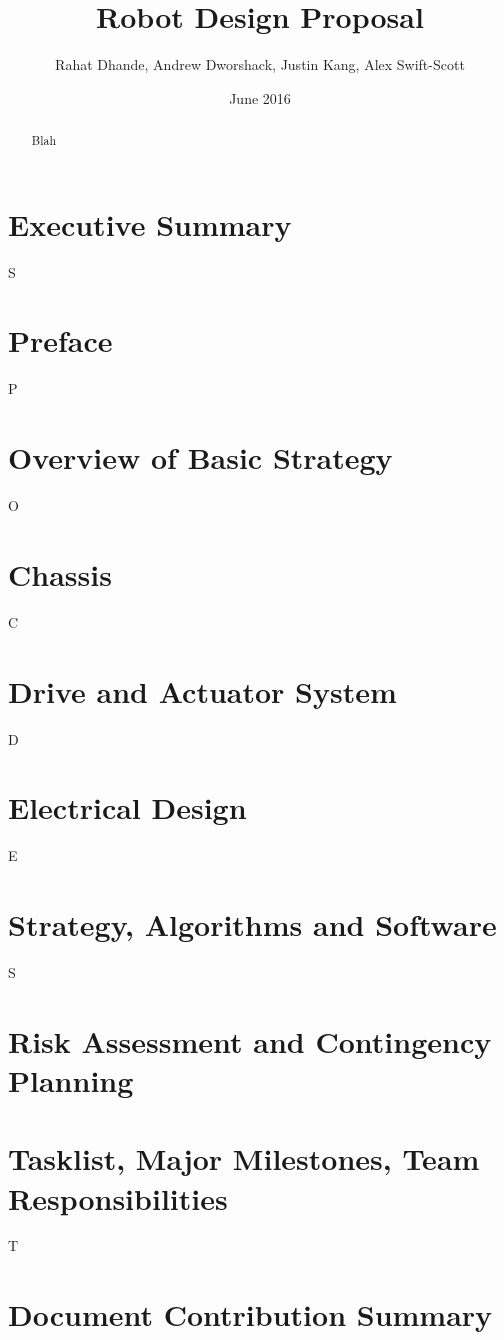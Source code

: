 \documentclass{article}
\title{Robot Design Proposal}
\author{Rahat Dhande, Andrew Dworshack, Justin Kang, Alex Swift-Scott}
\date{June 2016}
\begin{document}
\begin{titlingpage}
\maketitle
\begin{abstract}
Blah
\end{abstract}
\tableofcontents
\end{titlingpage}

\section{Executive Summary}
S

\section{Preface}
P

\section{Overview of Basic Strategy}
O

\section{Chassis}
C

\section{Drive and Actuator System}
D

\section{Electrical Design}
E

\section{Strategy, Algorithms and Software}
S

\section{Risk Assessment and Contingency Planning}
\hspace*{-8pt}

\section{Tasklist, Major Milestones, Team Responsibilities}
T

\section{Document Contribution Summary}
\hspace*{-8pt}
  
\end{document}
